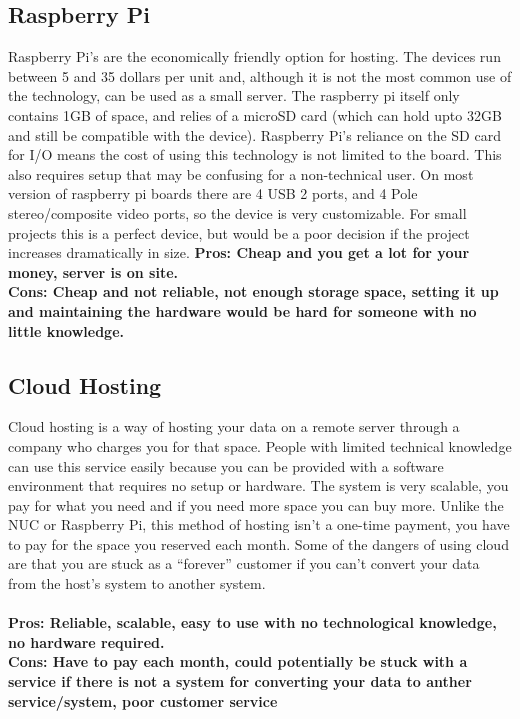 \documentclass[draftclsnofoot,onecolumn,letterpaper,10pt,compsoc]{IEEEtran}
\begin{document}
	\subsection{Raspberry Pi}
			Raspberry Pi's are the economically friendly option for hosting.
			The devices run between 5 and 35 dollars per unit and, although it is not the most common use of the technology, can be used as a small server\cite{CopaHost}.
			The raspberry pi itself only contains 1GB of space, and relies of a microSD card (which can hold upto 32GB and still be compatible with the device)\cite{CopaHost}.
			Raspberry Pi’s reliance on the SD card for I/O means the cost of using this technology is not limited to the board.
			This also requires setup that may be confusing for a non-technical user.
			On most version of raspberry pi boards there are 4 USB 2 ports, and 4 Pole stereo/composite video ports\cite{RaspberryPi}, so the device is very customizable.
			For small projects this is a perfect device, but would be a poor decision if the project increases dramatically in size.
			\textbf{Pros: Cheap and you get a lot for your money, server is on site.}
			\\
			\textbf{Cons: Cheap and not reliable, not enough storage space, setting it up and maintaining the hardware would be hard for someone with no little knowledge.}

	\subsection{Cloud Hosting}
        Cloud hosting is a way of hosting your data on a remote server through a company who charges you for that space.
				People with limited technical knowledge can use this service easily because you can be provided with a software environment that requires no setup or hardware\cite{InterRoute}.
				The system is very scalable, you pay for what you need and if you need more space you can buy more\cite{InterRoute}.
				Unlike the NUC or Raspberry Pi, this method of hosting isn't a one-time payment, you have to pay for the space you reserved each month\cite{TheBalance}.
				Some of the dangers of using cloud are that you are stuck as a “forever” customer if you can't convert your data from the host's system to another system\cite{TheBalance}.
				\\ \\
				\textbf{Pros: Reliable, scalable, easy to use with no technological knowledge, no hardware required.}
				\\
				\textbf{Cons: Have to pay each month, could potentially be stuck with a service if there is not a system for converting your data to anther service/system, poor customer service}
\end{document}

